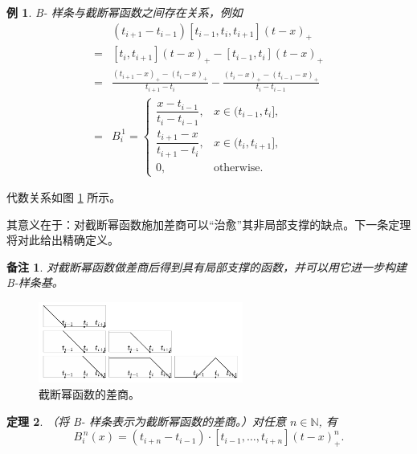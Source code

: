 \documentclass[a4paper]{ctexart}
\newtheorem{theorem}{定理}
\newtheorem*{remark*}{备注}
\newtheorem{example}[theorem]{例}
\numberwithin{theorem}{section}
\numberwithin{equation}{section}
\numberwithin{figure}{section}
\numberwithin{remark}{section}
\begin{document}
\begin{example}
    \label{ex::relation_bspline_truncated_power}
B- 样条与截断幂函数之间存在关系，例如
\begin{equation*}
    \begin{aligned}
&(t_{i+1}-t_{i-1})[t_{i-1},t_i,t_{i+1}](t-x)_{+}\\
=&[t_i,t_{i+1}](t-x)_{+}-[t_{i-1},t_i](t-x)_{+} \\
=&\frac{(t_{i+1}-x)_{+}-(t_{i}-x)_{+}}{t_{i+1}-t_i} 
-\frac{(t_{i}-x)_{+}-(t_{i-1}-x)_{+}}{t_i-t_{i-1}} \\
=&B^{\,1}_i
=
\begin{cases}
\dfrac{x-t_{i-1}}{t_i-t_{i-1}}, & x\in(t_{i-1},t_i],\\
\dfrac{t_{i+1}-x}{t_{i+1}-t_i}, & x\in(t_i,t_{i+1}],\\
0, & \text{otherwise}.
\end{cases}
\end{aligned}
\end{equation*}
\end{example}

代数关系如图 \ref{fig::dd_truncated_power} 所示。

其意义在于：对截断幂函数施加差商可以“治愈”其非局部支撑的缺点。下一条定理将对此给出精确定义。

\begin{remark*}
    对截断幂函数做差商后得到具有局部支撑的函数，并可以用它进一步构建 B-样条基。
\end{remark*}

\begin{figure}[h]
\centering
\includegraphics[width=0.6\textwidth]{images/truncated_power_functions.png}
\caption{截断幂函数的差商。}
\label{fig::dd_truncated_power}
\end{figure}

\begin{theorem}
    \label{thm::bspline_as_divdiff_truncated}
（将 B- 样条表示为截断幂函数的差商。）对任意 $n\in\mathbb{N}$, 有
\begin{equation}
\label{eq::Bn_divdiff_truncated}
B^{\,n}_i(x)=(t_{i+n}-t_{i-1})\cdot [t_{i-1},\ldots,t_{i+n}](t-x)^{n}_{+}.
\end{equation}
\end{theorem}
\end{document}
